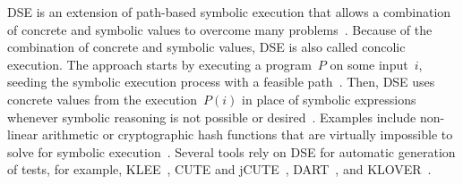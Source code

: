 \documentclass{article}
\begin{document}

\ac{DSE} is an extension of path-based symbolic execution that allows a combination of concrete and symbolic values to overcome many problems~\cite{Fraser_2013}. Because of the combination of concrete and symbolic values, \ac{DSE} is also called concolic execution. The approach starts by executing a program~$P$ on some input~$i$, seeding the symbolic execution process with a feasible path~\cite{Gupta2000,Korel1992}. Then, \ac{DSE} uses concrete values from the execution~$P(i)$ in place of symbolic expressions whenever symbolic reasoning is not possible or desired~\cite{Cadar2005}. Examples include non-linear arithmetic or cryptographic hash functions that are virtually impossible to solve for symbolic execution~\cite{Ball2015}. Several tools rely on \ac{DSE} for automatic generation of tests, for example, KLEE~\cite{cadar2008klee}, CUTE and jCUTE~\cite{Sen2006}, DART~\cite{Godefroid_2005}, and KLOVER~\cite{Li2011}.
\end{document}
